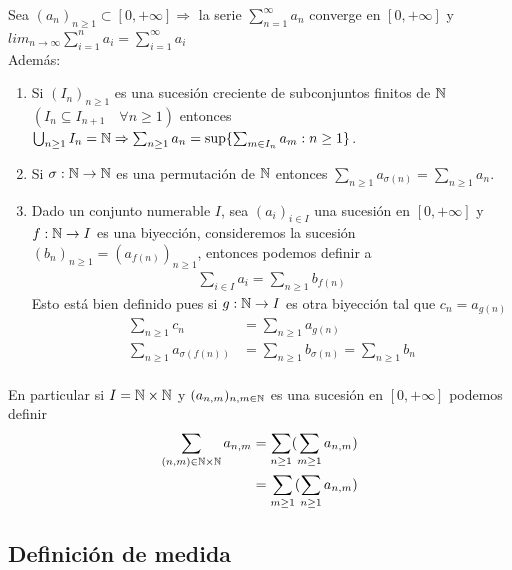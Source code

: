 \begin{prop}
    Sea \((a_n)_{n \geq 1} \subset [0, +\infty] \Rightarrow\) la serie \(\sum_{n = 1}^{\infty} a_n\) converge en \([0, +\infty]\)
    y \(lim_{n \to \infty} \sum_{i = 1}^{n} a_i = \sum_{i = 1}^{\infty} a_i  \) \\
    Además:
    \begin{enumerate}
        \item Si \((I_n)_{n \geq 1}\) es una sucesión creciente de subconjuntos finitos de \(\mathbb{N}\) \((I_n \subseteq I_{n+1} \quad \forall n \geq 1)\) entonces
              \(\bigcup_{n \geq 1} I_n = \mathbb{N} \Rightarrow \sum_{n \geq 1} a_n = \text{sup}\{ \sum_{m \in I_n} a_m : n \geq 1 \}\).
        \item Si \(\sigma: \mathbb{N} \to \mathbb{N}\) es una permutación de \(\mathbb{N}\) entonces \(\sum_{n \geq 1} a_{\sigma(n)} = \sum_{n \geq 1} a_n\).
        \item Dado un conjunto numerable \(I\), sea \((a_i)_{i \in I}\) una sucesión en \([0, +\infty]\) y \(f: \mathbb{N} \to I\) es una biyección, consideremos
              la sucesión \((b_n)_{n \geq 1} = (a_{f(n)})_{n \geq 1}\), entonces podemos definir a \begin{align*}
                  \sum_{i \in I} a_i = \sum_{n \geq 1} b_{f(n)}
              \end{align*}
              Esto está bien definido pues si \(g: \mathbb{N} \to I\) es otra biyección tal que \(c_n = a_{g(n)}\) \begin{align*}
                  \sum_{n \geq 1} c_n              & = \sum_{n \geq 1} a_{g(n)}                            \\
                  \sum_{n \geq 1} a_{\sigma(f(n))} & = \sum_{n \geq 1} b_{\sigma(n)} = \sum_{n \geq 1} b_n \\
              \end{align*}
    \end{enumerate}

    En particular si \(I = \mathbb{N} \times \mathbb{N}\) y \((a_{n, m})_{n, m \in \mathbb{N}}\) es una sucesión en \([0, +\infty]\) podemos definir \begin{align*}
        \sum_{(n, m) \in \mathbb{N} \times \mathbb{N}} a_{n, m} & = \sum_{n \geq 1}(\sum_{m \geq 1} a_{n, m}) \\
                                                & = \sum_{m \geq 1}(\sum_{n \geq 1} a_{n, m}) \\
    \end{align*}
\end{prop}

\subsection{Definición de medida}

